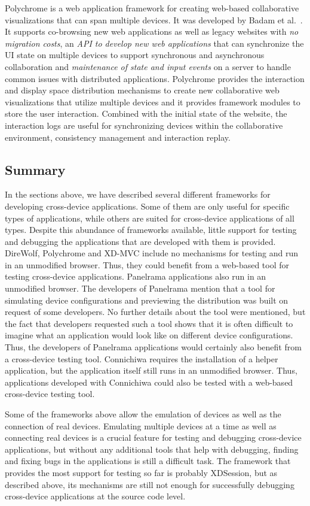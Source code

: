 Polychrome is a web application framework for creating web-based collaborative visualizations that can span multiple devices. It was developed by Badam et al.~\cite{polychrome2014}. It supports co-browsing new web applications as well as legacy websites with \emph{no migration costs}, an \emph{API to develop new web applications} that can synchronize the UI state on multiple devices to support synchronous and asynchronous collaboration and \emph{maintenance of state and input events} on a server to handle common issues with distributed applications. Polychrome provides the interaction and display space distribution mechanisms to create new collaborative web visualizations that utilize multiple devices and it provides framework modules to store the user interaction. Combined with the initial state of the website, the interaction logs are useful for synchronizing devices within the collaborative environment, consistency management and interaction replay.

\subsection{Summary}

In the sections above, we have described several different frameworks for developing cross-device applications. Some of them are only useful for specific types of applications, while others are suited for cross-device applications of all types. Despite this abundance of frameworks available, little support for testing and debugging the applications that are developed with them is provided. DireWolf, Polychrome and XD-MVC include no mechanisms for testing and run in an unmodified browser. Thus, they could benefit from a web-based tool for testing cross-device applications. Panelrama applications also run in an unmodified browser. The developers of Panelrama mention that a tool for simulating device configurations and previewing the distribution was built on request of some developers. No further details about the tool were mentioned, but the fact that developers requested such a tool shows that it is often difficult to imagine what an application would look like on different device configurations. Thus, the developers of Panelrama applications would certainly also benefit from a cross-device testing tool. Connichiwa requires the installation of a helper application, but the application itself still runs in an unmodified browser. Thus, applications developed with Connichiwa could also be tested with a web-based cross-device testing tool.

Some of the frameworks above allow the emulation of devices as well as the connection of real devices. Emulating multiple devices at a time as well as connecting real devices is a crucial feature for testing and debugging cross-device applications, but without any additional tools that help with debugging, finding and fixing bugs in the applications is still a difficult task. The framework that provides the most support for testing so far is probably XDSession, but as described above, its mechanisms are still not enough for successfully debugging cross-device applications at the source code level.